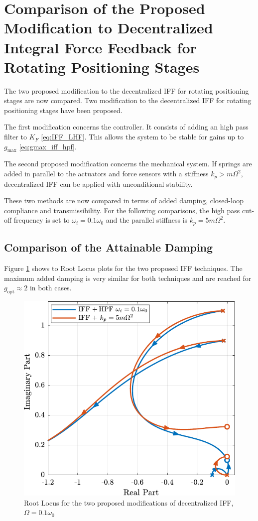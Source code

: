 \documentclass{ISMA_USD2020}
\begin{document}
\section{Comparison of the Proposed Modification to Decentralized Integral Force Feedback for Rotating Positioning Stages}
\label{sec:org25de90d}
\label{sec:comparison}
The two proposed modification to the decentralized IFF for rotating positioning stages are now compared.
Two modification to the decentralized IFF for rotating positioning stages have been proposed.

The first modification concerns the controller.
It consists of adding an high pass filter to \(K_F\) \eqref{eq:IFF_LHF}.
This allows the system to be stable for gains up to \(g_\text{max}\) \eqref{eq:gmax_iff_hpf}.

The second proposed modification concerns the mechanical system.
If springs are added in parallel to the actuators and force sensors with a stiffness \(k_p > m \Omega^2\), decentralized IFF can be applied with unconditional stability.

These two methods are now compared in terms of added damping, closed-loop compliance and transmissibility.
For the following comparisons, the high pass cut-off frequency is set to \(\omega_i = 0.1 \omega_0\) and the parallel stiffness is \(k_p = 5 m \Omega^2\).
\subsection{Comparison of the Attainable Damping}
\label{sec:orgd307a58}
Figure \ref{fig:comp_root_locus} shows to Root Locus plots for the two proposed IFF techniques.
The maximum added damping is very similar for both techniques and are reached for \(g_\text{opt} \approx 2\) in both cases.

\begin{figure}[htbp]
\centering
\includegraphics[scale=1]{figs/comp_root_locus.pdf}
\caption{\label{fig:comp_root_locus}Root Locus for the two proposed modifications of decentralized IFF, \(\Omega = 0.1 \omega_0\)}
\end{figure}
\end{document}
